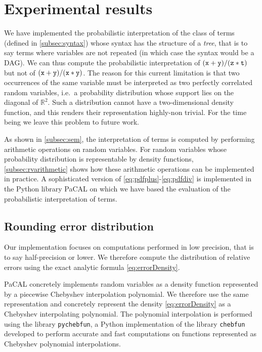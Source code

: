 \documentclass[10pt,conference]{IEEEtran}
\newcommand{\ie}{i.e.\ }
\newcommand{\R}{\mathbb{R}}
\begin{document}
\section{Experimental results}\label{sec:exp}

We have implemented the probabilistic interpretation of the class of terms (defined in \cref{subsec:syntax}) whose syntax has the structure of a \emph{tree}, that is to say terms where variables are not repeated (in which case the syntax would be a DAG). We can thus compute the probabilistic interpretation of $\tt (x+y)/(z\ast t)$ but not of $\tt (x+y)/(x\ast y)$. The reason for this current limitation is that two occurrences of the same variable must be interpreted as two perfectly correlated random variables, \ie a probability distribution whose support lies on the diagonal of $\R^2$. Such a distribution cannot have a two-dimensional density function, and this renders their representation highly-non trivial. For the time being we leave this problem to future work.

As shown in \cref{subsec:sem}, the interpretation of terms is computed by performing arithmetic operations on random variables. For random variables whose probability distribution is representable by density functions, \cref{subsec:rvarithmetic} shows how these arithmetic operations can be implemented in practice. A sophisticated version of \cref{eq:pdfplus}-\cref{eq:pdfdiv} is implemented in the Python library PaCAL
\cite{jaroszewicz2012arithmetic}\cite{korzen2014pacal} on which we have based the evaluation of the probabilistic interpretation of terms.

\subsection{Rounding error distribution}
Our implementation focuses on computations performed in low precision, that is to say half-precision or lower. We therefore compute the distribution of relative errors using the exact analytic formula \cref{eq:errorDensity}.

PaCAL concretely implements random variables as a density function represented by a piecewise Chebyshev interpolation polynomial. We therefore use the same representation and concretely represent the density \cref{eq:errorDensity} as a Chebyshev interpolating polynomial. The polynomial interpolation is performed using the library \texttt{pychebfun}, a Python implementation of the library \texttt{chebfun} \cite{battles2004extension} developed to perform accurate and fast computations on functions represented as Chebyshev polynomial interpolations.
\end{document}
